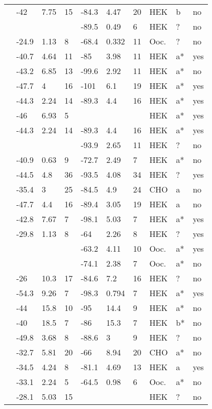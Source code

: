 \begin{longtable}{p{5cm}|lll|lll|lll}
\citet{Valdivia2004MutationDB} & -42 & 7.75 & 15 & -84.3 & 4.47 & 20 & HEK & b & no \\
\citet{Vatta2002aMutationDB} & && & -89.5 & 0.49 & 6 & HEK & ? & no \\
\citet{Vatta2002bMutationDB} & -24.9 & 1.13 & 8 & -68.4 & 0.332 & 11 & Ooc. & ? & no \\
\citet{Viswanathan2003MutationDB} & -40.7 & 4.64 & 11 & -85 & 3.98 & 11 & HEK & a* & yes \\
\citet{Wang1996MutationDB} & -43.2 & 6.85 & 13 & -99.6 & 2.92 & 11 & HEK & a* & no \\
\citet{Wang2002MutationDB} & -47.7 & 4 & 16 & -101 & 6.1 & 19 & HEK & a* & yes \\
\citet{Wang2007aMutationDB} & -44.3 & 2.24 & 14 & -89.3 & 4.4 & 16 & HEK & a* & yes \\
\citet{Wang2007bMutationDB} & -46 & 6.93 & 5 & && & HEK & a* & yes \\
\citet{Wang2008MutationDB} & -44.3 & 2.24 & 14 & -89.3 & 4.4 & 16 & HEK & a* & yes \\
\citet{Wang2011MutationDB} & && & -93.9 & 2.65 & 11 & HEK & ? & no \\
\citet{Wang2015MutationDB} & -40.9 & 0.63 & 9 & -72.7 & 2.49 & 7 & HEK & a* & no \\
\citet{Wang2016MutationDB} & -44.5 & 4.8 & 36 & -93.5 & 4.08 & 34 & HEK & ? & yes \\
\citet{Watanabe2011bMutationDB} & -35.4 & 3 & 25 & -84.5 & 4.9 & 24 & CHO & a & no \\
\citet{Watanabe2011bMutationDB} & -47.7 & 4.4 & 16 & -89.4 & 3.05 & 19 & HEK & a & no \\
\citet{Wedekind2001MutationDB} & -42.8 & 7.67 & 7 & -98.1 & 5.03 & 7 & HEK & a* & yes \\
\citet{Wehrens2003MutationDB} & -29.8 & 1.13 & 8 & -64 & 2.26 & 8 & HEK & ? & yes \\
\citet{Wei1999MutationDB} & && & -63.2 & 4.11 & 10 & Ooc. & a* & yes \\
\citet{Wei1999MutationDB} & && & -74.1 & 2.38 & 7 & Ooc. & a* & no \\
\citet{Winkel2012MutationDB} & -26 & 10.3 & 17 & -84.6 & 7.2 & 16 & HEK & ? & no \\
\citet{Yang2002MutationDB} & -54.3 & 9.26 & 7 & -98.3 & 0.794 & 7 & HEK & a* & yes \\
\citet{Ye2003MutationDB} & -44 & 15.8 & 10 & -95 & 14.4 & 9 & HEK & a* & no \\
\citet{Ye2003MutationDB} & -40 & 18.5 & 7 & -86 & 15.3 & 7 & HEK & b* & no \\
\citet{Yokoi2005MutationDB} & -49.8 & 3.68 & 8 & -88.6 & 3 & 9 & HEK & ? & no \\
\citet{Young2005MutationDB} & -32.7 & 5.81 & 20 & -66 & 8.94 & 20 & CHO & a* & no \\
\citet{Zeng2013MutationDB} & -34.5 & 4.24 & 8 & -81.1 & 4.69 & 13 & HEK & a & yes \\
\citet{Zhang2008MutationDB} & -33.1 & 2.24 & 5 & -64.5 & 0.98 & 6 & Ooc. & a* & no \\
\citet{Zhang2015MutationDB} & -28.1 & 5.03 & 15 & && & HEK & ? & no \\
\end{longtable}
